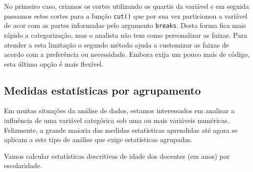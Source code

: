 \documentclass[12pt,]{style/krantz}
\makeatletter
\newenvironment{Shaded}{\begin{snugshade}}{\end{snugshade}}
\newcommand{\KeywordTok}[1]{\textcolor[rgb]{0.13,0.29,0.53}{\textbf{#1}}}
\newcommand{\DataTypeTok}[1]{\textcolor[rgb]{0.13,0.29,0.53}{#1}}
\newcommand{\DecValTok}[1]{\textcolor[rgb]{0.00,0.00,0.81}{#1}}
\newcommand{\FloatTok}[1]{\textcolor[rgb]{0.00,0.00,0.81}{#1}}
\newcommand{\StringTok}[1]{\textcolor[rgb]{0.31,0.60,0.02}{#1}}
\newcommand{\CommentTok}[1]{\textcolor[rgb]{0.56,0.35,0.01}{\textit{#1}}}
\newcommand{\OtherTok}[1]{\textcolor[rgb]{0.56,0.35,0.01}{#1}}
\newcommand{\OperatorTok}[1]{\textcolor[rgb]{0.81,0.36,0.00}{\textbf{#1}}}
\newcommand{\NormalTok}[1]{#1}
\newenvironment{kframe}{%
\medskip{}
\setlength{\fboxsep}{.8em}
 \def\at@end@of@kframe{}%
 \ifinner\ifhmode%
  \def\at@end@of@kframe{\end{minipage}}%
  \begin{minipage}{\columnwidth}%
 \fi\fi%
 \def\FrameCommand##1{\hskip\@totalleftmargin \hskip-\fboxsep
 \colorbox{shadecolor}{##1}\hskip-\fboxsep
     \hskip-\linewidth \hskip-\@totalleftmargin \hskip\columnwidth}%
 \MakeFramed {\advance\hsize-\width
   \@totalleftmargin\z@ \linewidth\hsize
   \@setminipage}}%
 {\par\unskip\endMakeFramed%
 \at@end@of@kframe}
\renewenvironment{Shaded}{\begin{kframe}}{\end{kframe}}
\theoremstyle{definition}
\theoremstyle{definition}
\theoremstyle{definition}
\theoremstyle{remark}
\let\BeginKnitrBlock\begin \let\EndKnitrBlock\end
\makeatother
\begin{document}
No primeiro caso, criamos os cortes utilizando os quartis da variável e
em seguida passamos estes cortes para a função \texttt{cut()} que por
sua vez particionou a variável de acor com as partes informadas pelo
argumento \texttt{breaks}. Desta forma fica mais rápido a categorização,
mas o analista não tem como personalizar as faixas. Para atender a esta
limitação o segundo método ajuda a customizar as faixas de acordo com a
preferência ou necessidade. Embora exija um pouco mais de código, esta
última opção é mais flexível.

\subsection{Medidas estatísticas por
agrupamento}\label{medidas-estatisticas-por-agrupamento}

Em muitas situações da análise de dados, estamos interessados em
analisar a influência de uma variável categórica sob uma ou mais
variáveis numéricas. Felizmente, a grande maioria das medidas
estatísticas aprendidas até agora se aplicam a este tipo de análise que
exige estatísticas agrupadas.

\BeginKnitrBlock{example}
\protect\hypertarget{exm:unnamed-chunk-80}{}{\label{exm:unnamed-chunk-80}
}Vamos calcular estatísticas descritivas de idade dos docentes (em anos)
por escolaridade.
\EndKnitrBlock{example}

\begin{Shaded}
\end{Shaded}
\end{document}
